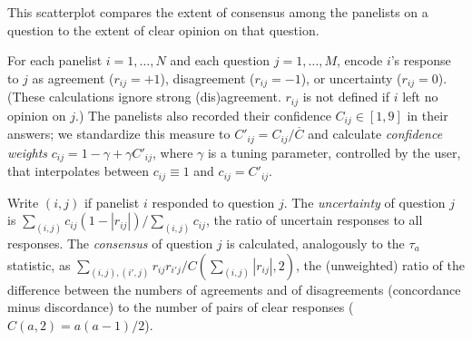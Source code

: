 \documentclass{article}
\begin{document}
This scatterplot compares the extent of consensus among the panelists on a question to the extent of clear opinion on that question.

For each panelist \(i=1,\ldots,N\) and each question \(j=1,\ldots,M\), encode \(i\)'s response to \(j\) as agreement (\(r_{ij}=+1\)), disagreement (\(r_{ij}=-1\)), or uncertainty (\(r_{ij}=0\)). (These calculations ignore strong (dis)agreement. \(r_{ij}\) is not defined if \(i\) left no opinion on \(j\).) The panelists also recorded their confidence \(C_{ij}\in[1,9]\) in their answers; we standardize this measure to \(C'_{ij}=C_{ij}/\overline{C}\) and calculate {\em confidence weights} \(c_{ij}=1-\gamma+\gamma C'_{ij}\), where \(\gamma\) is a tuning parameter, controlled by the user, that interpolates between \(c_{ij}\equiv 1\) and \(c_{ij}=C'_{ij}\).

Write \((i,j)\) if panelist \(i\) responded to question \(j\). The {\em uncertainty} of question \(j\) is \(\sum_{(i,j)}{c_{ij}(1-|r_{ij}|)}/\sum_{(i,j)}{c_{ij}}\), the ratio of uncertain responses to all responses. The {\em consensus} of question \(j\) is calculated, analogously to the \(\tau_a\) statistic, as \(\sum_{(i,j),(i',j)}{r_{ij}r_{i'j}}/{C(\sum_{(i,j)}{|r_{ij}|},2)}\), the (unweighted) ratio of the difference between the numbers of agreements and of disagreements (concordance minus discordance) to the number of pairs of clear responses (\(C(a,2)=a(a-1)/2\)).
\end{document}
